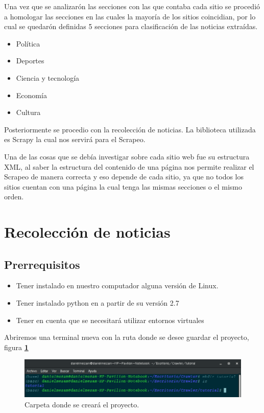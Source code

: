 Una vez que se analizarón las secciones con las que contaba cada sitio se procedió a homologar las secciones en las cuales la mayoría de los 
sitios coincidian, por lo cual se quedarón definidas 5 secciones para clasificación de las noticias extraídas.

\begin{itemize}
    \item Política
    \item Deportes
    \item Ciencia y tecnología
    \item Economía
    \item Cultura
\end{itemize}

Posteriormente se procedio con la recolección de noticias. 
La biblioteca utilizada es Scrapy la cual nos servirá para el Scrapeo.

Una de las cosas que se debía investigar sobre cada sitio web fue su estructura XML, al saber la estructura del contenido de una página  
nos permite realizar el Scrapeo de manera correcta y eso depende de cada sitio, ya que no todos los sitios cuentan con una página la cual tenga 
las mismas secciones o el mismo orden.
\\

\section{Recolección de noticias}

\subsection{Prerrequisitos}
\begin{itemize}
    \item Tener instalado en nuestro computador alguna versión de Linux.
    \item Tener instalado python en a partir de su versión 2.7
    \item Tener en cuenta que se necesitará utilizar entornos virtuales
\end{itemize}

Abriremos una terminal nueva con la ruta donde se desee guardar el proyecto, figura \textbf{\ref{fig:uno}} 

\begin{figure}[H]
  \centering
  \includegraphics[scale=.35]{imagenes/Capitulo5/1}
  \caption{Carpeta donde se creará el proyecto.}
  \label{fig:uno}
\end{figure}

